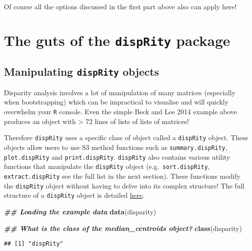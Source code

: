 \documentclass[
]{book}
\newenvironment{Shaded}{\begin{snugshade}}{\end{snugshade}}
\newcommand{\DocumentationTok}[1]{\textcolor[rgb]{0.56,0.35,0.01}{\textbf{\textit{#1}}}}
\newcommand{\FunctionTok}[1]{\textcolor[rgb]{0.13,0.29,0.53}{\textbf{#1}}}
\newcommand{\NormalTok}[1]{#1}
\begin{document}
Of course all the options discussed in the first part above also can apply here!

\hypertarget{the-guts-of-the-disprity-package}{%
\chapter{\texorpdfstring{The guts of the \texttt{dispRity} package}{The guts of the dispRity package}}\label{the-guts-of-the-disprity-package}}

\hypertarget{manipulating-disprity-objects}{%
\section{\texorpdfstring{Manipulating \texttt{dispRity} objects}{Manipulating dispRity objects}}\label{manipulating-disprity-objects}}

Disparity analysis involves a lot of manipulation of many matrices (especially when bootstrapping) which can be impractical to visualise and will quickly overwhelm your \texttt{R} console.
Even the simple Beck and Lee 2014 example above produces an object with \textgreater{} 72 lines of lists of lists of matrices!

Therefore \texttt{dispRity} uses a specific class of object called a \texttt{dispRity} object.
These objects allow users to use S3 method functions such as \texttt{summary.dispRity}, \texttt{plot.dispRity} and \texttt{print.dispRity}.
\texttt{dispRity} also contains various utility functions that manipulate the \texttt{dispRity} object (e.g.~\texttt{sort.dispRity}, \texttt{extract.dispRity} see the full list in the next section).
These functions modify the \texttt{dispRity} object without having to delve into its complex structure!
The full structure of a \texttt{dispRity} object is detailed \href{https://github.com/TGuillerme/dispRity/blob/master/disparity_object.md}{here}.

\begin{Shaded}
\begin{Highlighting}[]
\DocumentationTok{\#\# Loading the example data}
\FunctionTok{data}\NormalTok{(disparity)}

\DocumentationTok{\#\# What is the class of the median\_centroids object?}
\FunctionTok{class}\NormalTok{(disparity)}
\end{Highlighting}
\end{Shaded}

\begin{verbatim}
## [1] "dispRity"
\end{verbatim}
\end{document}
